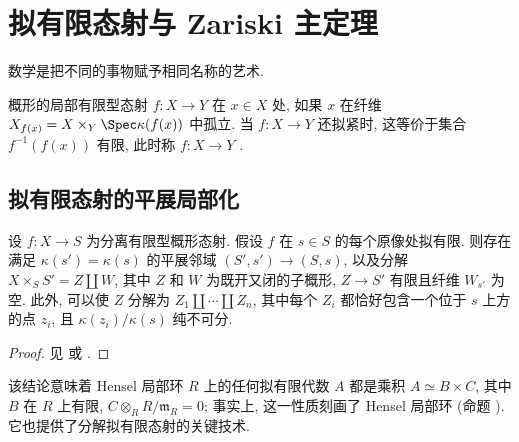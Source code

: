 \section{拟有限态射与 Zariski 主定理}\label{src:A.7}
\begin{epigraph}
数学是把不同的事物赋予相同名称的艺术.
\end{epigraph}
概形的局部有限型态射 $f:X\to Y$ 在 $x\in X$ 处, 如果 $x$ 在纤维 $X_{f(x)}=X\times_Y\Spec\kappa(f(x))$ 中孤立. 当 $f:X\to Y$ 还拟紧时, 这等价于集合 $f^{-1}(f(x))$ 有限, 此时称 $f:X\to Y$ .

\subsection{拟有限态射的平展局部化}\label{src:A.7.1-subsection}
\begin{theorem}[拟有限态射的平展局部化]\label{src:A.7.1}
设 $f:X\to S$ 为分离有限型概形态射. 假设 $f$ 在 $s\in S$ 的每个原像处拟有限. 则存在满足 $\kappa(s')=\kappa(s)$ 的平展邻域 $(S',s')\to(S,s)$, 以及分解 $X\times_S S'=Z\coprod W$, 其中 $Z$ 和 $W$ 为既开又闭的子概形, $Z\to S'$ 有限且纤维 $W_{s'}$ 为空. 此外, 可以使 $Z$ 分解为 $Z_1\coprod\cdots\coprod Z_n$, 其中每个 $Z_i$ 都恰好包含一个位于 $s$ 上方的点 $z_i$, 且 $\kappa(z_i)/\kappa(s)$ 纯不可分.
\end{theorem}
\begin{proof}
见 \cite[IV.$8.12.3$]{EGA} 或 \cite[Tag 04HF]{SP}.
\end{proof}
该结论意味着 Hensel 局部环 $R$ 上的任何拟有限代数 $A$ 都是乘积 $A\simeq B\times C$, 其中 $B$ 在 $R$ 上有限, $C\otimes_R R/\mathfrak m_R=0$; 事实上, 这一性质刻画了 Hensel 局部环 (命题 ). 它也提供了分解拟有限态射的关键技术.

